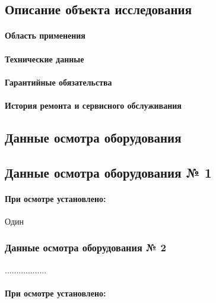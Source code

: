 \subsection{Описание объекта исследования}

\paragraph{Область применения}

\paragraph{Технические данные}

\paragraph{Гарантийные обязательства}

\paragraph{История ремонта и сервисного обслуживания}

\subsection{Данные осмотра оборудования}



\subsection{Данные осмотра оборудования № 1}


\paragraph{При  осмотре установлено:}

Один



\subsubsection{Данные осмотра оборудования № 2}

..................



\paragraph{При  осмотре установлено:}

